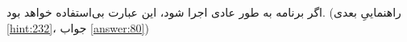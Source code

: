 \section{}
\paragraph{}\label{hint:175}
اگر برنامه به طور عادی اجرا شود، این عبارت بی‌استفاده خواهد بود. (راهنماییِ بعدی \ref{hint:232}، جواب \ref{answer:80})